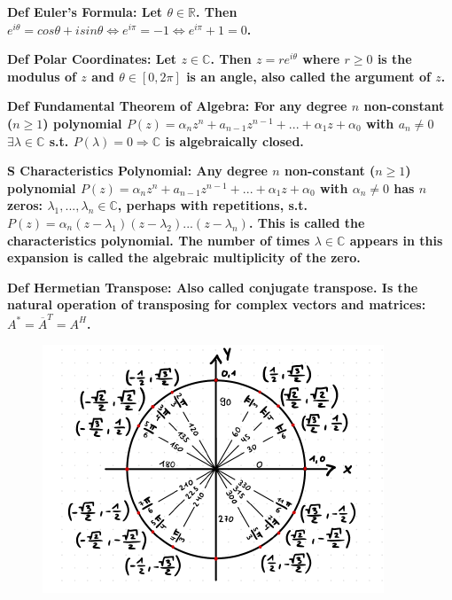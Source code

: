 \documentclass[7pt,landscape, margin = 0.1mm]{article}
\newcommand{\DEF}[2]{\color{chaptercolor}\bf{Def #1}:\color{black}    \hspace{0.2cm} #2}
\newcommand{\SA}[2]{\color{chaptercolor}\bf{S #1}:\color{black}    \hspace{0.2cm} #2}
\begin{document}
\begin{multicols}{4}
\begin{flushleft}
{\DEF{Euler's Formula}{Let $\theta\in\mathbb{R}$. Then $e^{i\theta}=cos\theta+isin\theta \Leftrightarrow e^{i\pi}=-1 \Leftrightarrow e^{i\pi}+1=0$.}

\DEF{Polar Coordinates}{Let $z\in\mathbb{C}$. Then $z=re^{i\theta}$ where $r\geq0$ is the modulus of $z$ and $\theta\in[0,2\pi]$ is an angle, also called the argument of $z$.}

\DEF{Fundamental Theorem of Algebra}{For any degree $n$ non-constant ($n\geq1$) polynomial $P(z)=\alpha_nz^n+a_{n-1}z^{n-1}+...+\alpha_1z+\alpha_0$ with $a_n\neq0$ $\exists \lambda\in\mathbb{C}$ s.t. $P(\lambda)=0 \Rightarrow \mathbb{C}$ is algebraically closed.}

\SA{Characteristics Polynomial}{Any degree $n$ non-constant ($n\geq1$) polynomial $P(z)=\alpha_nz^n+a_{n-1}z^{n-1}+...+\alpha_1z+\alpha_0$ with $\alpha_n\neq0$ has $n$ zeros: $\lambda_1,...,\lambda_n\in\mathbb{C}$, perhaps with repetitions, s.t. $P(z)=\alpha_n(z-\lambda_1)(z-\lambda_2)...(z-\lambda_n)$. This is called the characteristics polynomial. The number of times $\lambda\in\mathbb{C}$ appears in this expansion is called the algebraic multiplicity of the zero.}

\DEF{Hermetian Transpose}{Also called conjugate transpose. Is the natural operation of transposing for complex vectors and matrices: $A^*=\overline{A}^T=A^H$.}

\begin{figure}[H]
 \centering
 \includegraphics[width=\linewidth,keepaspectratio]{pictures/complex_numbers.png}
\end{figure}





}
\end{flushleft}
\end{multicols}
\end{document}
